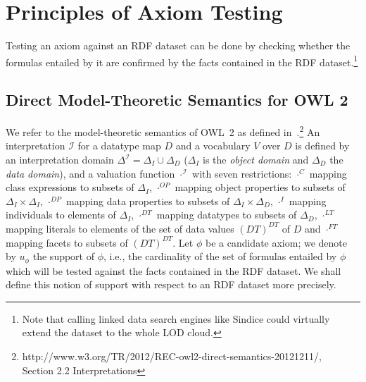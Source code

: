 \documentclass[conference]{IEEEtran}
\begin{document}
\section{Principles of Axiom Testing}\label{principles}

Testing an axiom against an RDF dataset can be done by checking whether the formulas entailed by it
are confirmed by the facts contained in the RDF dataset.\footnote{Note that calling linked data search engines
like Sindice could virtually extend the dataset to the whole LOD cloud.}

\subsection{Direct Model-Theoretic Semantics for OWL 2}
We refer to the model-theoretic semantics of OWL~2 as defined in~\cite{OWL2-direct-semantics}.\footnote{http://www.w3.org/TR/2012/REC-owl2-direct-semantics-20121211/, \\Section 2.2 Interpretations}
An interpretation $\mathcal{I}$ for a datatype map $D$ and a vocabulary $V$ over $D$ is defined by an interpretation domain $\Delta^\mathcal{I}=\Delta_{I}\cup\Delta_{D}$  ($\Delta_{I}$ is the \textit{object domain} and $\Delta_{D}$ the \textit{data domain}), and a valuation function $\cdot^{\mathcal{I}}$ with seven restrictions: $\cdot^{C}$ mapping class expressions to subsets of $\Delta_{I}$,  $\cdot^{OP}$ mapping object properties to subsets of $\Delta_{I}\times\Delta_{I}$, $\cdot^{DP}$ mapping data properties to subsets of $\Delta_{I}\times\Delta_{D}$, $\cdot^{I}$ mapping individuals to elements of $\Delta_{I}$, $\cdot^{DT}$ mapping datatypes to subsets of $\Delta_{D}$, $\cdot^{LT}$ mapping literals to elements of the set of data values $(DT)^{DT}$ of $D$ and $\cdot^{FT}$ mapping facets to subsets of $(DT)^{DT}$.
Let $\phi$ be a candidate axiom; we denote by $u_\phi$ the support of $\phi$,
i.e., the cardinality of the set of formulas entailed by $\phi$ which will be tested
against the facts contained in the RDF dataset.
We shall define this notion of support with respect to an RDF dataset more precisely.
\end{document}
